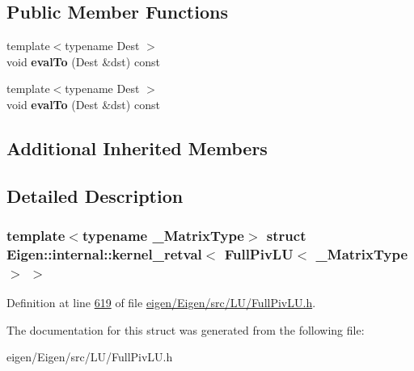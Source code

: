 \subsection*{Public Member Functions}
\begin{DoxyCompactItemize}
\item 
\mbox{\label{struct_eigen_1_1internal_1_1kernel__retval_3_01_full_piv_l_u_3_01___matrix_type_01_4_01_4_a1e8b6aafb22358f65a436cff4c3ed9b4}} 
{\footnotesize template$<$typename Dest $>$ }\\void {\bfseries eval\+To} (Dest \&dst) const
\item 
\mbox{\label{struct_eigen_1_1internal_1_1kernel__retval_3_01_full_piv_l_u_3_01___matrix_type_01_4_01_4_a1e8b6aafb22358f65a436cff4c3ed9b4}} 
{\footnotesize template$<$typename Dest $>$ }\\void {\bfseries eval\+To} (Dest \&dst) const
\end{DoxyCompactItemize}
\subsection*{Additional Inherited Members}


\subsection{Detailed Description}
\subsubsection*{template$<$typename \+\_\+\+Matrix\+Type$>$\newline
struct Eigen\+::internal\+::kernel\+\_\+retval$<$ Full\+Piv\+L\+U$<$ \+\_\+\+Matrix\+Type $>$ $>$}



Definition at line \hyperlink{eigen_2_eigen_2src_2_l_u_2_full_piv_l_u_8h_source_l00619}{619} of file \hyperlink{eigen_2_eigen_2src_2_l_u_2_full_piv_l_u_8h_source}{eigen/\+Eigen/src/\+L\+U/\+Full\+Piv\+L\+U.\+h}.



The documentation for this struct was generated from the following file\+:\begin{DoxyCompactItemize}
\item 
eigen/\+Eigen/src/\+L\+U/\+Full\+Piv\+L\+U.\+h\end{DoxyCompactItemize}

